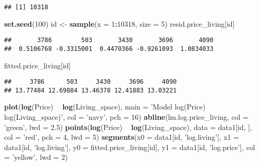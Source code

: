 \documentclass[
]{article}
\newenvironment{Shaded}{\begin{snugshade}}{\end{snugshade}}
\newcommand{\DataTypeTok}[1]{\textcolor[rgb]{0.13,0.29,0.53}{#1}}
\newcommand{\DecValTok}[1]{\textcolor[rgb]{0.00,0.00,0.81}{#1}}
\newcommand{\FloatTok}[1]{\textcolor[rgb]{0.00,0.00,0.81}{#1}}
\newcommand{\KeywordTok}[1]{\textcolor[rgb]{0.13,0.29,0.53}{\textbf{#1}}}
\newcommand{\NormalTok}[1]{#1}
\newcommand{\OperatorTok}[1]{\textcolor[rgb]{0.81,0.36,0.00}{\textbf{#1}}}
\newcommand{\StringTok}[1]{\textcolor[rgb]{0.31,0.60,0.02}{#1}}
\begin{document}
\begin{verbatim}
## [1] 10318
\end{verbatim}

\begin{Shaded}
\begin{Highlighting}[]
\KeywordTok{set.seed}\NormalTok{(}\DecValTok{100}\NormalTok{)}
\NormalTok{id <-}\StringTok{ }\KeywordTok{sample}\NormalTok{(}\DataTypeTok{x =} \DecValTok{1}\OperatorTok{:}\DecValTok{10318}\NormalTok{, }\DataTypeTok{size =} \DecValTok{5}\NormalTok{)}
\NormalTok{resid.price_living[id]}
\end{Highlighting}
\end{Shaded}

\begin{verbatim}
##       3786        503       3430       3696       4090 
##  0.5106768 -0.3315001  0.4470366 -0.9261093  1.0834033
\end{verbatim}

\begin{Shaded}
\begin{Highlighting}[]
\NormalTok{fitted.price_living[id]}
\end{Highlighting}
\end{Shaded}

\begin{verbatim}
##     3786      503     3430     3696     4090 
## 13.77484 12.69884 13.46378 12.41883 13.03221
\end{verbatim}

\begin{Shaded}
\begin{Highlighting}[]
\KeywordTok{plot}\NormalTok{(}\KeywordTok{log}\NormalTok{(Price) }\OperatorTok{~}\StringTok{ }\KeywordTok{log}\NormalTok{(Living_space), }\DataTypeTok{main =} \StringTok{'Model log(Price) ~ log(Living_space)'}\NormalTok{, }\DataTypeTok{col =} \StringTok{'navy'}\NormalTok{, }\DataTypeTok{pch =} \DecValTok{16}\NormalTok{)}
\KeywordTok{abline}\NormalTok{(lm.log.price_living, }\DataTypeTok{col =} \StringTok{'green'}\NormalTok{, }\DataTypeTok{lwd =} \FloatTok{2.5}\NormalTok{)}
\KeywordTok{points}\NormalTok{(}\KeywordTok{log}\NormalTok{(Price) }\OperatorTok{~}\StringTok{ }\KeywordTok{log}\NormalTok{(Living_space), }\DataTypeTok{data =}\NormalTok{ data1[id, ], }\DataTypeTok{col =} \StringTok{'red'}\NormalTok{, }\DataTypeTok{pch =} \DecValTok{4}\NormalTok{, }\DataTypeTok{lwd =} \DecValTok{5}\NormalTok{)}
\KeywordTok{segments}\NormalTok{(}\DataTypeTok{x0 =}\NormalTok{ data1[id, }\StringTok{'log.living'}\NormalTok{], }\DataTypeTok{x1 =}\NormalTok{ data1[id, }\StringTok{'log.living'}\NormalTok{],}
         \DataTypeTok{y0 =}\NormalTok{ fitted.price_living[id], }\DataTypeTok{y1 =}\NormalTok{ data1[id, }\StringTok{'log.price'}\NormalTok{], }\DataTypeTok{col =} \StringTok{'yellow'}\NormalTok{, }\DataTypeTok{lwd =} \DecValTok{2}\NormalTok{)}
\end{Highlighting}
\end{Shaded}
\end{document}
